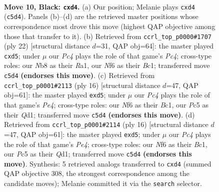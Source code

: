 \documentclass[11pt]{article}
\begin{document}
\clearpage

\begin{figure}[p]\centering
\begin{subfigure}{0.46\textwidth}\centering
\resizebox{\linewidth}{!}{%
\newchessgame
\chessboard[
  setfen={rn1q1rk1/1p1bbppp/4pn2/p1p5/P1PP3P/5NP1/4PPB1/RNBQ1RK1 b - - 0 10},
  showmover=false,
  pgfstyle=straightmove, color=movearrow, markmove={c5-d4}
]}
\caption{}
\end{subfigure}\hfill
\begin{subfigure}{0.46\textwidth}\centering
\resizebox{\linewidth}{!}{%
\newchessgame
\chessboard[
  setfen={rnbq1rk1/pp2ppbp/5np1/P2p4/2PP4/2N2N2/1P2BPPP/R1BQ1RK1 w - - 0 12},
  showmover=false,
  pgfstyle=straightmove, color=movearrow, markmove={c4-d5}
]}
\caption{}
\end{subfigure}
\\[4pt]
\begin{subfigure}{0.46\textwidth}\centering
\resizebox{\linewidth}{!}{%
\newchessgame
\chessboard[
  setfen={rnbq1rk1/pp3pbp/3p1np1/2pp4/4P3/2N2NP1/PPP2PBP/R1BQ1RK1 w - - 0 9},
  showmover=false,
  pgfstyle=straightmove, color=movearrow, markmove={e4-d5}
]}
\caption{}
\end{subfigure}\hfill
\begin{subfigure}{0.46\textwidth}\centering
\resizebox{\linewidth}{!}{%
\newchessgame
\chessboard[
  setfen={rnbq1rk1/pp3pbp/3p1np1/2pp4/4P3/2N2NP1/PPP2PBP/R1BQ1RK1 w - - 0 9},
  showmover=false,
  pgfstyle=straightmove, color=movearrow, markmove={e4-d5}
]}
\caption{}
\end{subfigure}
\caption{\textbf{Move 10, Black: \texttt{cxd4}.} (a) Our position; Melanie plays \texttt{cxd4} (\texttt{c5d4}). Panels (b)--(d) are the retrieved master positions whose correspondence most drove this move (highest QAP objective among those that transfer to it). (b) Retrieved from \texttt{ccrl\_top\_p0000\#1707} (ply 22) [structural distance $d$=31, QAP obj=64]: the master played \texttt{cxd5}; under $\mu$ our \emph{Pc4} plays the role of that game's \emph{Pc4}; cross-type roles: our \emph{N}b8 as their \emph{R}a1, our \emph{N}f6 as their \emph{B}c1; transferred move \texttt{c5d4} \textbf{(endorses this move)}. (c) Retrieved from \texttt{ccrl\_top\_p0001\#2113} (ply 16) [structural distance $d$=47, QAP obj=61]: the master played \texttt{exd5}; under $\mu$ our \emph{Pc4} plays the role of that game's \emph{Pe4}; cross-type roles: our \emph{N}f6 as their \emph{B}c1, our \emph{P}c5 as their \emph{Q}d1; transferred move \texttt{c5d4} \textbf{(endorses this move)}. (d) Retrieved from \texttt{ccrl\_top\_p0001\#2114} (ply 16) [structural distance $d$=47, QAP obj=61]: the master played \texttt{exd5}; under $\mu$ our \emph{Pc4} plays the role of that game's \emph{Pe4}; cross-type roles: our \emph{N}f6 as their \emph{B}c1, our \emph{P}c5 as their \emph{Q}d1; transferred move \texttt{c5d4} \textbf{(endorses this move)}. Synthesis: 5 retrieved analogs transferred to \texttt{cxd4} (summed QAP objective 308, the strongest correspondence among the candidate moves); Melanie committed it via the \texttt{search} selector.}
\label{fig:thought-m19}
\end{figure}
\end{document}
